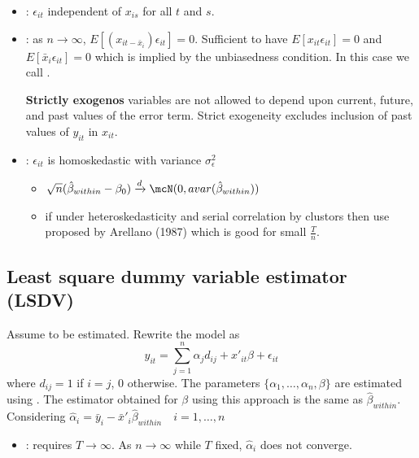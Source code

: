 \begin{itemize}
    \item {}: $\epsilon_{it}$ independent of $x_{is}$ for all $t$ and $s$.
    \item {}: as $n\to\infty$, $E[(x_{it-\bar{x}_i})\epsilon_{it}] = 0$. Sufficient to have $E[x_{it}\epsilon_{it}] = 0$ and $E[\bar{x}_i\epsilon_{it}] = 0$
    which is implied by the unbiasedness condition. In this case we call . 
    \begin{definition}
        \textbf{Strictly exogenos} variables are not allowed to depend upon current, future, and past values of the error term.
        Strict exogeneity excludes inclusion of past values of $y_{it}$ in $x_{it}$.
    \end{definition}
    \item {}: $\epsilon_{it}$ is homoskedastic with variance $\sigma^2_{\epsilon}$
    \begin{itemize}
        \item $\sqrt{n}(\hat{\beta}_{within}-\beta_0)\xrightarrow{d}\mcN(0,avar(\hat{\beta}_{within}))$
        \item if under heteroskedasticity and serial correlation by clustors then use  proposed by Arellano (1987)
        which is good for small $\frac{T}{n}$.
    \end{itemize}
\end{itemize}

\subsection{Least square dummy variable estimator (LSDV)}

Assume  to be estimated. Rewrite the model as 
\begin{equation*}
    y_{it} = \sum_{j=1}^{n} \alpha_j d_{ij} + x'_{it}\beta + \epsilon_{it}
\end{equation*}
where $d_{ij} = 1$ if $i=j$, $0$ otherwise. The parameters $\{\alpha_1,\ldots,\alpha_n,\beta\}$ are estimated using .
The estimator obtained for $\beta$ using this approach is the same as $\hat{\beta}_{within}$.\\

Considering $\hat{\alpha}_i = \bar{y}_i - \bar{x}'_i\hat{\beta}_{within}\quad i=1,\ldots,n$
\begin{itemize}
    \item {}: requires $T\to\infty$. As $n\to\infty$ while $T$ fixed, $\hat{\alpha}_i$ does not converge.
\end{itemize}

